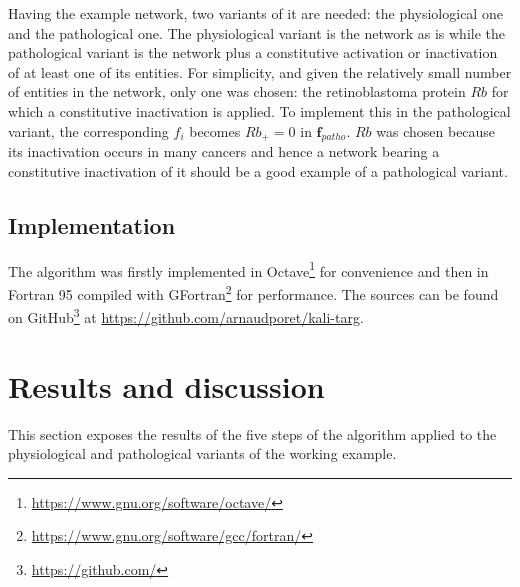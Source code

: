 \documentclass[oneside,a4paper,onecolumn,notitlepage]{article}
\begin{document}
Having the example network, two variants of it are needed: the physiological one and the pathological one. The physiological variant is the network as is while the pathological variant is the network plus a constitutive activation or inactivation of at least one of its entities. For simplicity, and given the relatively small number of entities in the network, only one was chosen: the retinoblastoma protein $Rb$ for which a constitutive inactivation is applied. To implement this in the pathological variant, the corresponding $f_i$ becomes $Rb_{+}=0$ in $\boldsymbol{f}_{patho}$.
$Rb$ was chosen because its inactivation occurs in many cancers \cite{sherr2002rb} and hence a network bearing a constitutive inactivation of it should be a good example of a pathological variant.

\subsection{Implementation}
The algorithm was firstly implemented in Octave\footnote{\url{https://www.gnu.org/software/octave/}} for convenience and then in Fortran 95 compiled with GFortran\footnote{\url{https://www.gnu.org/software/gcc/fortran/}} for performance. The sources can be found on GitHub\footnote{\url{https://github.com/}} at \url{https://github.com/arnaudporet/kali-targ}.

\section{Results and discussion}
This section exposes the results of the five steps of the algorithm applied to the physiological and pathological variants of the working example.
\end{document}
